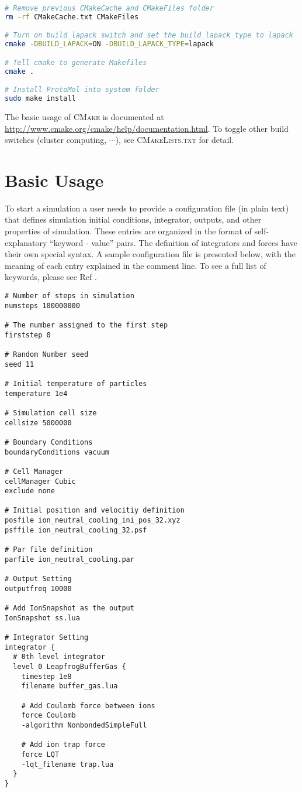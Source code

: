 \documentclass[10pt,a4paper]{article}
\begin{document}
\begin{lstlisting}[language=bash]
# Remove previous CMakeCache and CMakeFiles folder
rm -rf CMakeCache.txt CMakeFiles

# Turn on build_lapack switch and set the build_lapack_type to lapack
cmake -DBUILD_LAPACK=ON -DBUILD_LAPACK_TYPE=lapack 

# Tell cmake to generate Makefiles
cmake .

# Install ProtoMol into system folder
sudo make install
\end{lstlisting}
The basic usage of \textsc{CMake} is documented at \url{http://www.cmake.org/cmake/help/documentation.html}. To toggle other build switches (cluster computing, $\cdots$), see \textsc{CMakeLists.txt} for detail.

\section{Basic Usage}
To start a simulation a user needs to provide a configuration file (in plain text) that defines simulation initial conditions, integrator, outputs, and other properties of simulation. These entries are organized in the format of self-explanatory ``keyword - value'' pairs. The definition of integrators and forces have their own special syntax. A sample configuration file is presented below, with the meaning of each entry explained in the comment line. To see a full list of keywords, please see Ref \cite{Matthey2004, ProtoMolQuickRef}.
\begin{lstlisting}
# Number of steps in simulation
numsteps 100000000

# The number assigned to the first step
firststep 0

# Random Number seed
seed 11

# Initial temperature of particles
temperature 1e4

# Simulation cell size
cellsize 5000000

# Boundary Conditions
boundaryConditions vacuum

# Cell Manager
cellManager Cubic
exclude none

# Initial position and velocitiy definition
posfile ion_neutral_cooling_ini_pos_32.xyz
psffile ion_neutral_cooling_32.psf

# Par file definition
parfile ion_neutral_cooling.par

# Output Setting
outputfreq 10000

# Add IonSnapshot as the output
IonSnapshot ss.lua

# Integrator Setting
integrator {
  # 0th level integrator
  level 0 LeapfrogBufferGas {
    timestep 1e8
    filename buffer_gas.lua	
        
    # Add Coulomb force between ions
    force Coulomb 
    -algorithm NonbondedSimpleFull
        
    # Add ion trap force
    force LQT 
    -lqt_filename trap.lua
  }
}
\end{lstlisting}
\end{document}
